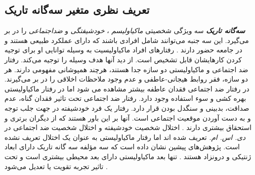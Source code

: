 


\subsection{تعریف نظری متغیر سه‌گانه تاریک}
\textit{
    \textbf{
        سه‌گانه تاریک
    }
}
سه ویژگی شخصیتی
\textit{
    ماکیاولیسم
}
\!،
\textit{
    خودشیفتگی
}
و
\textit{
    ضداجتماعی
}
را در بر می‌گیرد. این سه جنبه می‌توانند شامل افرادی باشند که دارای عملکرد طبیعی هستند و در جامعه حضور دارند
\!\citep{paulhusDarkTriadPersonality2002}
\!.
رفتارهای افراد ماکیاولیسیت به وسیله توانایی او برای توجیه کردن
کارهایشان قابل تشخیص است. از دید آنها هدف وسیله را توجیه
می‌کند. رفتار ضد اجتماعی و ماکیاولیستی دو سازه جدا هستند، هرچند همپوشانی
مفهومی دارند. هر دو سازه، فقر روابط هیجانی-عاطفی و عدم وجود
ملاحظات اخلاقی را در بر می‌گیرند. در رفتار ضد اجتماعی فقدان عاطفه
بیشتر مشاهده می شود
\!\citep{paulhusDarkTriadPersonality2002,vernonBehavioralGeneticInvestigation2008}
اما در رفتار ماکیاولیستی بهره کشی و سوء استفاده وجود دارد.
رفتار ضد اجتماعی تحت تاثیر فقدان گناه، عدم صداقت، بدبینی و
سنگدل بودن قرار دارد.
رفتار یک فرد خودشیفته  در جهت جلب توجه و به دست آوردن موقعیت
اجتماعی است. آنها بر این باور هستند که از دیگران برتری و استحقاق بیشتری دارند
\!. اختلال شخصیت خودشیفته و اختلال شخصیت ضد اجتماعی در
\textit{
    دی. اس. ام.
}
\!\!
تعریف شده اند اما رفتار ماکیاولیستی به
عنوان یک اختلال تعریف نشده است. پژوهش‌های پیشین نشان داده است که سه
مؤلفه سه گانه تاریک دارای ابعاد ژنتیکی و درونزاد هستند
\!\citep{kvTraitEmotionalIntelligence2011}
\!.
تنها بعد ماکیاولیستی دارای بعد محیطی بیشتری است و تحت تاثیر تجربه تقویت یا تعدیل می‌شود
\!.

